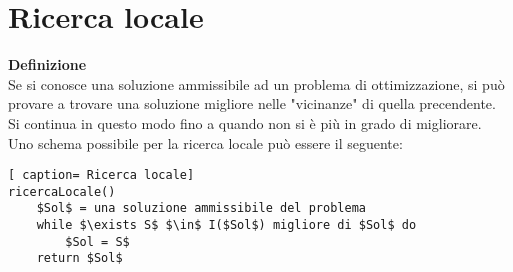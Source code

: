 \documentclass[../cheatSheetAlgoritmi.tex]{subfiles}
\begin{document}
\section{Ricerca locale}
\textbf{Definizione}\\
Se si conosce una soluzione ammissibile ad un problema di ottimizzazione, si può provare a trovare una soluzione migliore nelle "vicinanze" di quella precendente. Si continua in questo modo fino a quando non si è più in grado di migliorare. \\
Uno schema possibile per la ricerca locale può essere il seguente:
\begin{lstlisting}[ caption= Ricerca locale]
ricercaLocale()
	$Sol$ = una soluzione ammissibile del problema
	while $\exists S$ $\in$ I($Sol$) migliore di $Sol$ do
		$Sol = S$
	return $Sol$
\end{lstlisting}
\end{document}
